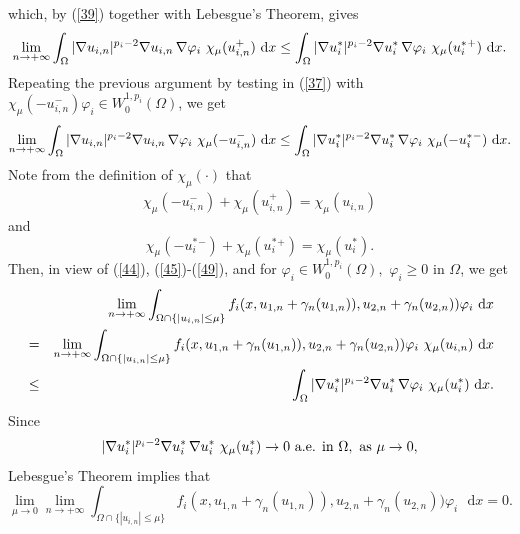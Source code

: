 \documentclass[11pt]{amsart}
\theoremstyle{definition}
\theoremstyle{remark}
\numberwithin{equation}{section}
\begin{document}
which, by (\ref{39}) together with Lebesgue's Theorem, gives%
\begin{equation}
\lim_{n\rightarrow +\infty }\int_{\Omega }|\nabla u_{i,n}|^{p_{i}-2}\nabla
u_{i,n}\text{\thinspace }\nabla \varphi _{i}\text{ }\chi _{\mu
}(u_{i,n}^{+}) \text{ }\mathrm{d}x\leq \int_{\Omega }|\nabla u_{i}^{\ast
}|^{p_{i}-2}\nabla u_{i}^{\ast }\text{\thinspace }\nabla \varphi _{i}\text{ }%
\chi _{\mu }(u_{i}^{\ast }{}^{+})\text{ }\mathrm{d}x.  \label{48}
\end{equation}%
Repeating the previous argument by testing in (\ref{37}) with $\chi _{\mu
}(-u_{i,n}^{-})\varphi _{i}\in W_{0}^{1,p_{i}}(\Omega )$, we get%
\begin{equation}
\lim_{n\rightarrow +\infty }\int_{\Omega }|\nabla u_{i,n}|^{p_{i}-2}\nabla
u_{i,n}\text{\thinspace }\nabla \varphi _{i}\text{ }\chi _{\mu
}(-u_{i,n}^{-})\text{ }\mathrm{d}x\leq \int_{\Omega }|\nabla u_{i}^{\ast
}|^{p_{i}-2}\nabla u_{i}^{\ast }\text{\thinspace }\nabla \varphi _{i}\text{ }
\chi _{\mu }(-u_{i}^{\ast }{}^{-})\text{ }\mathrm{d}x.  \label{49}
\end{equation}%
Note from the definition of $\chi _{\mu }(\cdot )$ that%
\begin{equation*}
\chi _{\mu }(-u_{i,n}^{-})+\chi _{\mu }(u_{i,n}^{+})=\chi _{\mu }(u_{i,n})
\end{equation*}%
and%
\begin{equation*}
\chi _{\mu }(-u_{i}^{\ast }{}^{-})+\chi _{\mu }(u_{i}^{\ast }{}^{+})=\chi
_{\mu }(u_{i}^{\ast }).
\end{equation*}%
Then, in view of (\ref{44}), (\ref{45})-(\ref{49}), and for $\varphi _{i}\in
W_{0}^{1,p_{i}}(\Omega ),$ $\varphi _{i}\geq 0$ in $\Omega $, we get%
\begin{eqnarray*}
&&\lim_{n\rightarrow +\infty }\int_{\Omega \cap \{|u_{i,n}|\leq \mu
\}}f_{i}(x,u_{1,n}+\gamma _{n}(u_{1,n})),u_{2,n}+\gamma
_{n}(u_{2,n}))\varphi _{i}\text{ }\mathrm{d}x \\
&=&\lim_{n\rightarrow +\infty }\int_{\Omega \cap \{|u_{i,n}|\leq \mu
\}}f_{i}(x,u_{1,n}+\gamma _{n}(u_{1,n})),u_{2,n}+\gamma
_{n}(u_{2,n}))\varphi _{i}\text{ }\chi _{\mu }(u_{i,n})\text{ }\mathrm{d}x \\
&\leq &\int_{\Omega }|\nabla u_{i}^{\ast }|^{p_{i}-2}\nabla u_{i}^{\ast } 
\text{\thinspace }\nabla \varphi _{i}\text{ }\chi _{\mu }(u_{i}^{\ast }) 
\text{ }\mathrm{d}x.
\end{eqnarray*}%
Since%
\begin{equation*}
|\nabla u_{i}^{\ast }|^{p_{i}-2}\nabla u_{i}^{\ast }\text{\thinspace }\nabla
u_{i}^{\ast }\text{ }\chi _{\mu }(u_{i}^{\ast })\rightarrow 0\text{ a.e. in }
\Omega ,\text{ as }\mu \rightarrow 0,
\end{equation*}%
Lebesgue's Theorem implies that 
\begin{equation}
\lim_{\mu \rightarrow 0}\lim_{n\rightarrow +\infty }\int_{\Omega \cap
\{|u_{i,n}|\leq \mu \}}f_{i}(x,u_{1,n}+\gamma _{n}(u_{1,n})),u_{2,n}+\gamma
_{n}(u_{2,n}))\varphi _{i}\text{ }\mathrm{d}x=0.  \label{50}
\end{equation}
\end{document}
